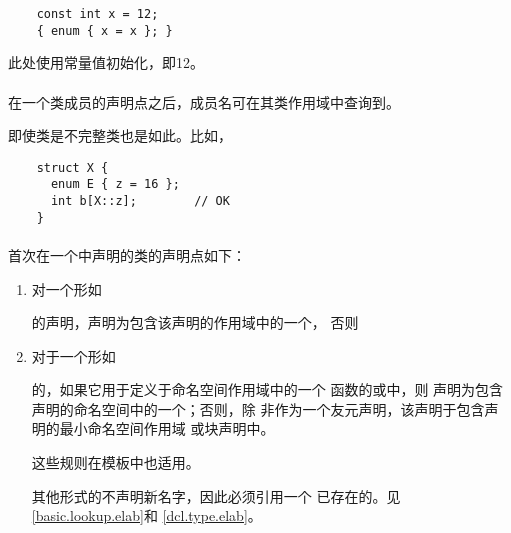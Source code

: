 \begin{example} %
  \begin{lstlisting}
    const int x = 12;
    { enum { x = x }; }
  \end{lstlisting}
  此处\enumr{}使用常量值初始化，即12。
\end{example}

\paragraph{} %
在一个类成员的声明点之后，成员名可在其类作用域中查询到。

\begin{note} %
  即使类是不完整类也是如此。比如，
  \begin{lstlisting}
    struct X {
      enum E { z = 16 };
      int b[X::z];        // OK
    }
  \end{lstlisting}
\end{note}

\paragraph{} %
首次在一个中声明的类的声明点如下：
\begin{enumerate}
  \item 对一个形如\par\qquad
           \tm{;}\par
        的声明，声明为包含该声明的作用域中的一个，
        否则
  \item 对于一个形如\par\qquad
           \par
        的，如果它用于定义于命名空间作用域中的一个
        函数的或中，则
        声明为包含声明的命名空间中的一个；否则，除
        非作为一个友元声明，该声明于包含声明的最小命名空间作用域
        或块声明中。

        \begin{note} %
          这些规则在模板中也适用。
        \end{note}

        \begin{note} %
          其他形式的不声明新名字，因此必须引用一个
          已存在的。见\ref{basic.lookup.elab}和
          \ref{dcl.type.elab}。
        \end{note}
\end{enumerate}

